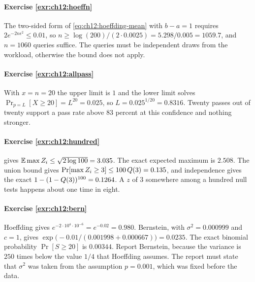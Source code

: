 \paragraph{Exercise \ref{exr:ch12:hoeffn}}
The two-sided form of \cref{eq:ch12:hoeffding-mean} with $b-a=1$ requires $2e^{-2n\epsilon^2}\le0.01$, so $n\ge\log(200)/(2\cdot0.0025)=5.298/0.005=1059.7$, and $n=1060$ queries suffice. The queries must be independent draws from the workload, otherwise the bound does not apply.

\paragraph{Exercise \ref{exr:ch12:allpass}}
With $x=n=20$ the upper limit is $1$ and the lower limit solves $\Pr_{p=L}[X\ge20]=L^{20}=0.025$, so $L=0.025^{1/20}=0.8316$. Twenty passes out of twenty support a pass rate above $83$ percent at this confidence and nothing stronger.

\paragraph{Exercise \ref{exr:ch12:hundred}}
 gives $\mathbb{E}\max Z_i\le\sqrt{2\log100}=3.035$. The exact expected maximum is $2.508$. The union bound gives $\Pr[\max Z_i\ge3]\le100\,Q(3)=0.135$, and independence gives the exact $1-(1-Q(3))^{100}=0.1264$. A $z$ of $3$ somewhere among a hundred null tests happens about one time in eight.

\paragraph{Exercise \ref{exr:ch12:bern}}
Hoeffding gives $e^{-2\cdot10^4\cdot10^{-6}}=e^{-0.02}=0.980$. Bernstein, with $\sigma^2=0.000999$ and $c=1$, gives $\exp\!\big(-0.01/(0.001998+0.000667)\big)=0.0235$. The exact binomial probability $\Pr[S\ge20]$ is $0.00344$. Report Bernstein, because the variance is $250$ times below the value $1/4$ that Hoeffding assumes. The report must state that $\sigma^2$ was taken from the assumption $p=0.001$, which was fixed before the data.
